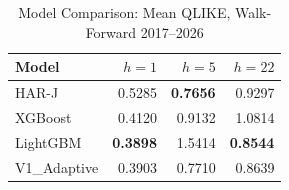 \begin{table}[htbp]
\centering
\caption{Model Comparison: Mean QLIKE, Walk-Forward 2017--2026}
\label{tab:model_summary}
\begin{tabular}{lrrr}
\toprule
Model & $h=1$ & $h=5$ & $h=22$ \\
\midrule
HAR-J & 0.5285 & \textbf{0.7656} & 0.9297 \\
XGBoost & 0.4120 & 0.9132 & 1.0814 \\
LightGBM & \textbf{0.3898} & 1.5414 & \textbf{0.8544} \\
V1\_Adaptive & 0.3903 & 0.7710 & 0.8639 \\
\bottomrule
\end{tabular}
\end{table}